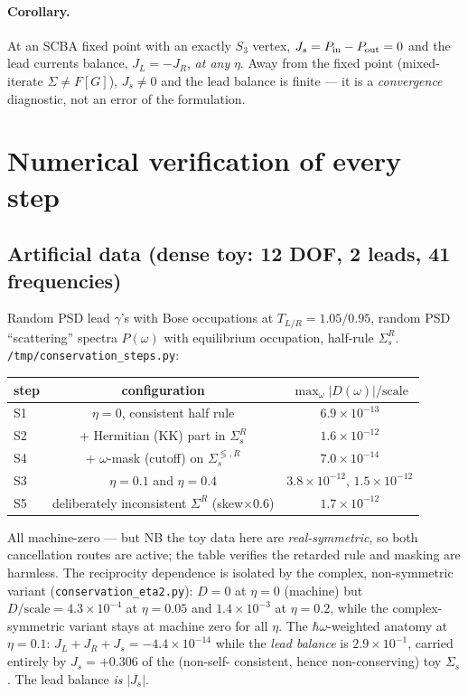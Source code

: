 \documentclass[11pt]{article}
\begin{document}
\paragraph{Corollary.}
At an SCBA fixed point with an exactly $S_3$ vertex,
$J_s=P_{\rm in}-P_{\rm out}=0$ and the lead currents balance,
$J_L=-J_R$, \emph{at any} $\eta$. Away from the fixed point
(mixed-iterate $\Sigma\neq F[G]$), $J_s\neq0$ and the lead balance is
finite --- it is a \emph{convergence} diagnostic, not an error of the
formulation.

\section{Numerical verification of every step}

\subsection{Artificial data (dense toy: 12 DOF, 2 leads, 41 frequencies)}
Random PSD lead $\gamma$'s with Bose occupations at $T_{L/R}=1.05/0.95$,
random PSD ``scattering'' spectra $P(\omega)$ with equilibrium occupation,
half-rule $\Sigma_s^R$. \texttt{/tmp/conservation\_steps.py}:

\begin{center}\begin{tabular}{lcc}
\toprule
step & configuration & $\max_\omega|D(\omega)|/\mathrm{scale}$\\
\midrule
S1 & $\eta=0$, consistent half rule        & $6.9\times10^{-13}$\\
S2 & + Hermitian (KK) part in $\Sigma^R_s$ & $1.6\times10^{-12}$\\
S4 & + $\omega$-mask (cutoff) on $\Sigma_s^{\lessgtr,R}$ & $7.0\times10^{-14}$\\
S3 & $\eta=0.1$ and $\eta=0.4$             & $3.8\times10^{-12}$, $1.5\times10^{-12}$\\
S5 & deliberately inconsistent $\Sigma^R$ (skew$\times$0.6) & $1.7\times10^{-12}$\\
\bottomrule
\end{tabular}\end{center}

All machine-zero --- but NB the toy data here are \emph{real-symmetric},
so both cancellation routes are active; the table verifies the retarded
rule and masking are harmless. The reciprocity dependence is isolated by
the complex, non-symmetric variant (\texttt{conservation\_eta2.py}):
$D=0$ at $\eta=0$ (machine) but $D/\mathrm{scale}=4.3\times10^{-4}$ at
$\eta=0.05$ and $1.4\times10^{-3}$ at $\eta=0.2$, while the
complex-symmetric variant stays at machine zero for all $\eta$.
The $\hbar\omega$-weighted anatomy at $\eta=0.1$:
$J_L+J_R+J_s=-4.4\times10^{-14}$ while the \emph{lead balance} is
$2.9\times10^{-1}$, carried entirely by $J_s=+0.306$ of the (non-self-%
consistent, hence non-conserving) toy $\Sigma_s$. The lead balance
\emph{is} $|J_s|$.
\end{document}
